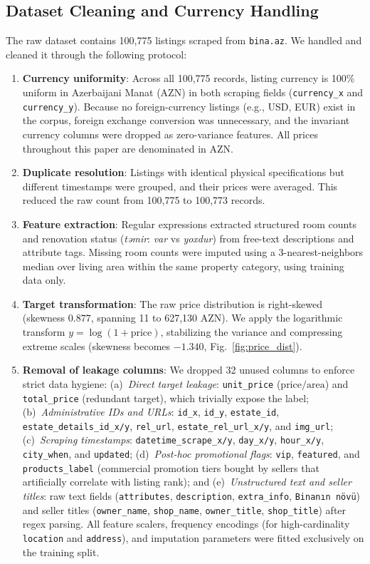 \documentclass[10pt,twocolumn,a4paper]{article}
\begin{document}
  \subsection{Dataset Cleaning and Currency Handling}
  The raw dataset contains 100,775 listings scraped from \texttt{bina.az}. We handled and cleaned it through the following protocol:
  \begin{enumerate}
    \item \textbf{Currency uniformity}: Across all 100,775 records, listing currency is 100\% uniform in Azerbaijani Manat (AZN) in both scraping fields (\texttt{currency\_x} and \texttt{currency\_y}). Because no foreign-currency listings (e.g., USD, EUR) exist in the corpus, foreign exchange conversion was unnecessary, and the invariant currency columns were dropped as zero-variance features. All prices throughout this paper are denominated in AZN.
    \item \textbf{Duplicate resolution}: Listings with identical physical specifications but different timestamps were grouped, and their prices were averaged. This reduced the raw count from 100,775 to 100,773 records.
    \item \textbf{Feature extraction}: Regular expressions extracted structured room counts and renovation status (\textit{təmir}: \textit{var} vs \textit{yoxdur}) from free-text descriptions and attribute tags. Missing room counts were imputed using a 3-nearest-neighbors median over living area within the same property category, using training data only.
    \item \textbf{Target transformation}: The raw price distribution is right-skewed (skewness $0.877$, spanning 11 to 627,130 AZN). We apply the logarithmic transform $y = \log(1 + \text{price})$, stabilizing the variance and compressing extreme scales (skewness becomes $-1.340$, Fig.~\ref{fig:price_dist}).
    \item \textbf{Removal of leakage columns}: We dropped 32 unused columns to enforce strict data hygiene:
    (a)~\textit{Direct target leakage}: \texttt{unit\_price} ($\text{price}/\text{area}$) and \texttt{total\_price} (redundant target), which trivially expose the label;
    (b)~\textit{Administrative IDs and URLs}: \texttt{id\_x}, \texttt{id\_y}, \texttt{estate\_id}, \texttt{estate\_details\_id\_x/y}, \texttt{rel\_url}, \texttt{estate\_rel\_url\_x/y}, and \texttt{img\_url};
    (c)~\textit{Scraping timestamps}: \texttt{datetime\_scrape\_x/y}, \texttt{day\_x/y}, \texttt{hour\_x/y}, \texttt{city\_when}, and \texttt{updated};
    (d)~\textit{Post-hoc promotional flags}: \texttt{vip}, \texttt{featured}, and \texttt{products\_label} (commercial promotion tiers bought by sellers that artificially correlate with listing rank); and
    (e)~\textit{Unstructured text and seller titles}: raw text fields (\texttt{attributes}, \texttt{description}, \texttt{extra\_info}, \texttt{Binanın növü}) and seller titles (\texttt{owner\_name}, \texttt{shop\_name}, \texttt{owner\_title}, \texttt{shop\_title}) after regex parsing.
    All feature scalers, frequency encodings (for high-cardinality \texttt{location} and \texttt{address}), and imputation parameters were fitted exclusively on the training split.
  \end{enumerate}
\end{document}
